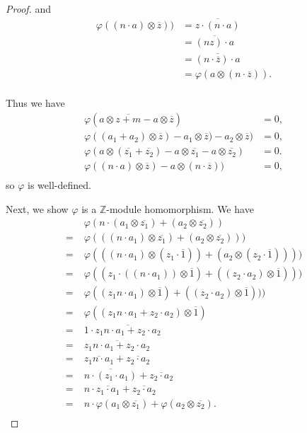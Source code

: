 \documentclass{article}
\begin{document}
\begin{enumerate}[label={(\alph*)}]
\begin{proof}
        and
        \begin{align*}
          \varphi((n\cdot a)\otimes \overline{z}))
          &=\overline{z\cdot (n\cdot a)}\\
          &=\overline{(nz)\cdot a}\\
          &=\overline{(n\cdot\overline{z})\cdot a}\\
          &=\varphi(a\otimes (n\cdot \overline{z})).\\
        \end{align*}

        Thus we have
        \begin{align*}
          \varphi(a\otimes\overline{z+m} -a\otimes\overline{z}) &=0,\\
          \varphi((a_1+a_2)\otimes\overline{z}) -a_1\otimes\overline{z})
            -a_2\otimes\overline{z}) &=0,\\
          \varphi(a\otimes(\overline{z_1}+\overline{z_2})
            -a\otimes\overline{z_1} -a\otimes\overline{z_2}) &=0.\\
          \varphi((n\cdot a)\otimes \overline{z}) -a\otimes (n\cdot
            \overline{z})) &=0,\\
        \end{align*}
        so $\varphi$ is well-defined.

        Next, we show $\varphi$ is a $\mathbb{Z}$-module homomorphism. We
        have
        \begin{align*}
          \;&\varphi(n\cdot(a_1\otimes \overline{z_1}) +(a_2\otimes
            \overline{z_2}))\\
          =\;&\varphi(((n\cdot a_1)\otimes\overline{z_1})
            +(a_2\otimes\overline{z_2})))\\
          =\;&\varphi(((n\cdot a_1)\otimes(z_1\cdot\overline{1}))
            +(a_2\otimes(z_2\cdot\overline{1}))))\\
          =\;&\varphi((z_1\cdot((n\cdot a_1))\otimes\overline{1})
            +((z_2\cdot a_2)\otimes\overline{1})))\\
          =\;&\varphi((z_1n\cdot a_1)\otimes\overline{1}) +((z_2\cdot
            a_2)\otimes\overline{1})))\\
          =\;&\varphi((z_1n\cdot a_1+z_2\cdot a_2)\otimes\overline{1})\\
          =\;&1\cdot\overline{z_1n\cdot a_1+z_2\cdot a_2}\\
          =\;&\overline{z_1n\cdot a_1+z_2\cdot a_2}\\
          =\;&\overline{z_1n\cdot a_1} +\overline{z_2\cdot a_2}\\
          =\;&\overline{n\cdot(z_1\cdot a_1)} +\overline{z_2\cdot a_2}\\
          =\;&n\cdot\overline{z_1\cdot a_1} +\overline{z_2\cdot a_2}\\
          =\;&n\cdot\varphi(a_1\otimes\overline{z_1})
            +\varphi(a_2\otimes\overline{z_2}).\\
        \end{align*}


\end{proof}
\end{enumerate}
\end{document}
